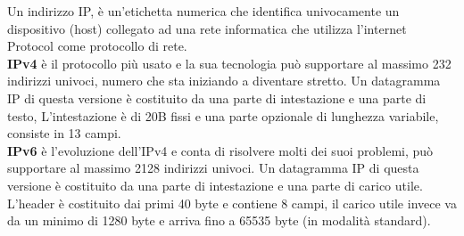 Un indirizzo IP, è un’etichetta numerica che identifica univocamente un dispositivo (host) collegato ad una rete informatica che utilizza l’internet Protocol come protocollo di rete.\\
\textbf{IPv4} è il protocollo più usato e la sua tecnologia può supportare al massimo 232 indirizzi univoci, numero che sta iniziando a diventare stretto.
Un datagramma IP di questa versione è costituito da una parte di intestazione e una parte di testo, L’intestazione è di 20B fissi e una parte opzionale di lunghezza variabile, consiste in 13 campi.\\
\textbf{IPv6} è l’evoluzione dell’IPv4 e conta di risolvere molti dei suoi problemi, può supportare al massimo 2128 indirizzi univoci.
Un datagramma IP di questa versione è costituito da una parte di intestazione e una parte di carico utile. L’header è costituito dai primi 40 byte e contiene 8 campi, il carico utile invece va da un minimo di 1280 byte e arriva fino a 65535 byte (in modalità standard).

